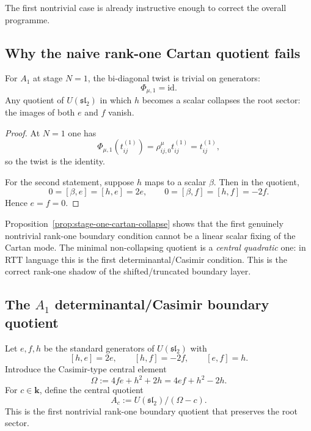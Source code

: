 The first nontrivial case is already instructive enough to correct the overall
programme.

\subsection{Why the naive rank-one Cartan quotient fails}

\begin{proposition}[Stage $N=1$ twist is trivial; naive Cartan fixing collapses the root sector \ClaimStatusProvedHere]
\label{prop:stage-one-cartan-collapse-appendix}
For $A_1$ at stage $N=1$, the bi-diagonal twist is trivial on generators:
\[
\Phi_{\mu,1}=\mathrm{id}.
\]
Any quotient of $U(\mathfrak{sl}_2)$ in which $h$ becomes a scalar
collapses the root sector: the images of both $e$ and $f$ vanish.
\end{proposition}

\begin{proof}
At $N=1$ one has
\[
\Phi_{\mu,1}(t_{ij}^{(1)})=\rho_{ij,0}^\mu t_{ij}^{(1)}=t_{ij}^{(1)},
\]
so the twist is the identity.

For the second statement, suppose $h$ maps to a scalar $\beta$. Then in the
quotient,
\[
0=[\beta,e]=[h,e]=2e,
\qquad
0=[\beta,f]=[h,f]=-2f.
\]
Hence $e=f=0$.
\end{proof}

\begin{remark}
\label{rem:first-non-collapsing-boundary-quotient}
Proposition~\ref{prop:stage-one-cartan-collapse} shows that the first genuinely
nontrivial rank-one boundary condition cannot be a linear scalar fixing of the
Cartan mode. The minimal non-collapsing quotient is a \emph{central quadratic}
one: in RTT language this is the first determinantal/Casimir condition. This
is the correct rank-one shadow of the shifted/truncated boundary layer.
\end{remark}

\subsection{The $A_1$ determinantal/Casimir boundary quotient}

Let $e,f,h$ be the standard generators of $U(\mathfrak{sl}_2)$ with
\[
[h,e]=2e,
\qquad
[h,f]=-2f,
\qquad
[e,f]=h.
\]
Introduce the Casimir-type central element
\[
\Omega:=4fe+h^2+2h=4ef+h^2-2h.
\]
For $c\in\mathbf{k}$, define the central quotient
\[
A_c:=U(\mathfrak{sl}_2)/(\Omega-c).
\]
This is the first nontrivial rank-one boundary quotient that preserves the root
sector.

